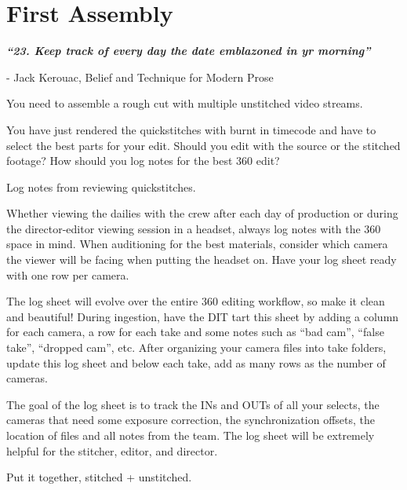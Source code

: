 \chapter{First Assembly}
\pagecolor{white}
\label{chap:31}
\begin{fullwidth}

{\itshape\bfseries “23. Keep track of every day the date emblazoned in yr morning”}

- Jack Kerouac, Belief and Technique for Modern Prose
\vspace{\baselineskip}

\problem

{\large You need to assemble a rough cut with multiple unstitched video streams. \par}

You have just rendered the quickstitches with burnt in timecode and have to select the best parts for your edit. Should you edit with the source or the stitched footage? How should you log notes for the best 360 edit?

\solution

{\large Log notes from reviewing quickstitches. \par}

Whether viewing the dailies with the crew after each day of production or during the director-editor viewing session in a headset, always log notes with the 360 space in mind. When auditioning for the best materials, consider which camera the viewer will be facing when putting the headset on. Have your log sheet ready with one row per camera. 


The log sheet will evolve over the entire 360 editing workflow, so make it clean and beautiful! During ingestion, have the DIT tart this sheet by adding a column for each camera, a row for each take and some notes such as “bad cam”, “false take”, “dropped cam”, etc. After organizing your camera files into take folders, update this log sheet and below each take, add as many rows as the number of cameras.


The goal of the log sheet is to track the INs and OUTs of all your selects, the cameras that need some exposure correction, the synchronization offsets, the location of files and all notes from the team. The log sheet will be extremely helpful for the stitcher, editor, and director.

{\large Put it together, stitched + unstitched. \par}


\end{fullwidth}
